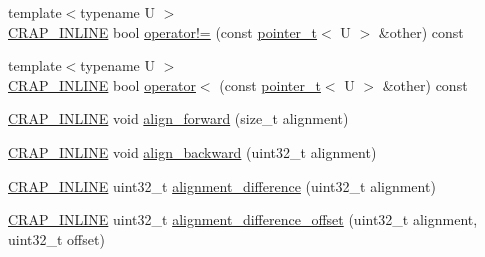 \begin{DoxyCompactItemize}
\item 
{\footnotesize template$<$typename U $>$ }\\\hyperlink{config__x86_8h_a5a40526b8d842e7ff731509998bb0f1c}{C\+R\+A\+P\+\_\+\+I\+N\+L\+I\+N\+E} bool \hyperlink{structcrap_1_1pointer__t_a407ceac5bd9c48e476a471b4d224a7ff}{operator!=} (const \hyperlink{structcrap_1_1pointer__t}{pointer\+\_\+t}$<$ U $>$ \&other) const 
\item 
{\footnotesize template$<$typename U $>$ }\\\hyperlink{config__x86_8h_a5a40526b8d842e7ff731509998bb0f1c}{C\+R\+A\+P\+\_\+\+I\+N\+L\+I\+N\+E} bool \hyperlink{structcrap_1_1pointer__t_ab85781483bbedd167fe5f2de0c50a0e4}{operator$<$} (const \hyperlink{structcrap_1_1pointer__t}{pointer\+\_\+t}$<$ U $>$ \&other) const 
\item 
\hyperlink{config__x86_8h_a5a40526b8d842e7ff731509998bb0f1c}{C\+R\+A\+P\+\_\+\+I\+N\+L\+I\+N\+E} void \hyperlink{structcrap_1_1pointer__t_ae1c918d1b41417dea3eff113eeb6745d}{align\+\_\+forward} (size\+\_\+t alignment)
\item 
\hyperlink{config__x86_8h_a5a40526b8d842e7ff731509998bb0f1c}{C\+R\+A\+P\+\_\+\+I\+N\+L\+I\+N\+E} void \hyperlink{structcrap_1_1pointer__t_a20af2bc4a6a7a4a80522b4ab247fb006}{align\+\_\+backward} (uint32\+\_\+t alignment)
\item 
\hyperlink{config__x86_8h_a5a40526b8d842e7ff731509998bb0f1c}{C\+R\+A\+P\+\_\+\+I\+N\+L\+I\+N\+E} uint32\+\_\+t \hyperlink{structcrap_1_1pointer__t_a7c1820d700423029c30a45c144242d6e}{alignment\+\_\+difference} (uint32\+\_\+t alignment)
\item 
\hyperlink{config__x86_8h_a5a40526b8d842e7ff731509998bb0f1c}{C\+R\+A\+P\+\_\+\+I\+N\+L\+I\+N\+E} uint32\+\_\+t \hyperlink{structcrap_1_1pointer__t_a2f97224de2956dd947fe10521a76558c}{alignment\+\_\+difference\+\_\+offset} (uint32\+\_\+t alignment, uint32\+\_\+t offset)
\end{DoxyCompactItemize}
